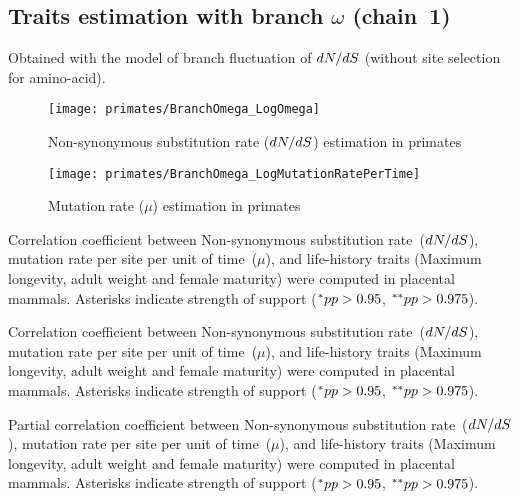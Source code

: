 \subsection{Traits estimation with branch \texorpdfstring{$\omega$}{ω} (chain~1)}
Obtained with the model of branch fluctuation of $\dnds$ (without site selection for amino-acid).

\begin{figure}[H]
    \centering
    \texttt{[image: primates/BranchOmega\_LogOmega]}
    \caption[$\dnds$ estimation in primates]{{Non-synonymous substitution} rate ($\dnds$) estimation in primates}
\end{figure}

\begin{figure}[H]
    \centering
    \texttt{[image: primates/BranchOmega\_LogMutationRatePerTime]}
    \caption[$\mu$ estimation in primates]{Mutation rate ($\mu$) estimation in primates}
\end{figure}

\begin{table}[H]
    
    \caption[Correlation coefficient matrix in primates ($\dnds$)]{
    Correlation coefficient between Non-synonymous \gls{substitution} rate~($\dnds$), mutation rate per site per unit of time~($\mu$), and life-history traits (Maximum longevity, adult weight and female maturity) were computed in placental mammals.
    Asterisks indicate strength of support ($\smash{^{*}} pp > 0.95$, $\smash{^{**}} pp > 0.975$).}
\end{table}

\begin{table}[H]
    
    \caption[Covariance matrix in primates ($\dnds$)]{
    Correlation coefficient between Non-synonymous \gls{substitution} rate~($\dnds$), mutation rate per site per unit of time~($\mu$), and life-history traits (Maximum longevity, adult weight and female maturity) were computed in placental mammals.
    Asterisks indicate strength of support ($\smash{^{*}} pp > 0.95$, $\smash{^{**}} pp > 0.975$).}
\end{table}

\begin{table}[H]
    
    \caption[Partial correlation coefficient matrix in primates ($\dnds$)]{
    Partial correlation coefficient between Non-synonymous \gls{substitution} rate~($\dnds$), mutation rate per site per unit of time~($\mu$), and life-history traits (Maximum longevity, adult weight and female maturity) were computed in placental mammals.
    Asterisks indicate strength of support ($\smash{^{*}} pp > 0.95$, $\smash{^{**}} pp > 0.975$).}
\end{table}


